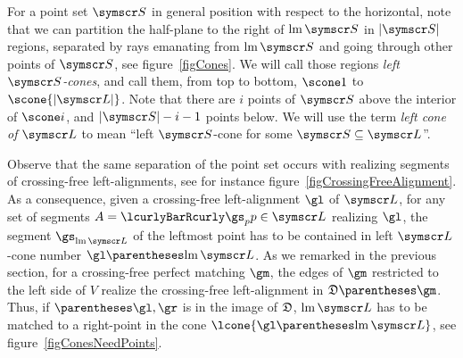 For a point set $\pointset S$ in general position with respect to the horizontal,
note that we can partition the half-plane to the right of $\leftmost\pointset S$ in
$\Cardinality{\pointset S}$ regions,
separated by rays emanating from $\leftmost\pointset S$ and going through other points of
$\pointset S$, see figure~\ref{figCones}.
We will call those regions \emph{left $\pointset S$-cones}, and call them, from top to bottom, $\scone 1$ to
$\scone {\Cardinality{\pointset L}}$.
Note that there are $i$ points of $\pointset S$ above the interior of $\scone i$,
and $\Cardinality {\pointset S} - i - 1$ points below.
We will use the term \emph{left cone of $\pointset L$} to mean
``left $\pointset S$-cone for some $\pointset S\Subset\pointset L$''.

Observe that the same separation of the point set occurs with realizing segments of crossing-free left-alignments,
see for instance figure~\ref{figCrossingFreeAlignment}.
As a consequence, given a crossing-free left-alignment
$\gl$ of $\pointset L$, for any set of segments $A=\setst{\gs_p}{p\in\pointset L}$
realizing $\gl$, the segment $\gs_{\leftmost\pointset L}$ of the leftmost point has to be contained in left
$\pointset L$-cone number $\gl\of{\leftmost\pointset L}$.
As we remarked in the previous section, for a crossing-free perfect matching $\gm$, the edges of $\gm$ restricted
to the left side of $V$ realize the crossing-free
left-alignment in $\decomposition\of\gm$. Thus, if $\tuple{\gl, \gr}$ is in the image of
$\mathfrak{D}$, $\leftmost\pointset L$ has to be matched to a right-point in the cone
$\lcone{\gl\of{\leftmost\pointset L}}$, see figure~\ref{figConesNeedPoints}.

